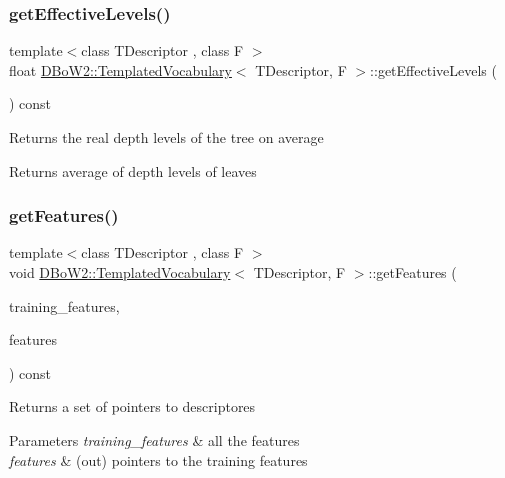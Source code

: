 \subsubsection{\texorpdfstring{get\+Effective\+Levels()}{getEffectiveLevels()}}
{\footnotesize\ttfamily template$<$class T\+Descriptor , class F $>$ \\
float \mbox{\hyperlink{class_d_bo_w2_1_1_templated_vocabulary}{D\+Bo\+W2\+::\+Templated\+Vocabulary}}$<$ T\+Descriptor, F $>$\+::get\+Effective\+Levels (\begin{DoxyParamCaption}{ }\end{DoxyParamCaption}) const}

Returns the real depth levels of the tree on average \begin{DoxyReturn}{Returns}
average of depth levels of leaves 
\end{DoxyReturn}
\mbox{\label{class_d_bo_w2_1_1_templated_vocabulary_ace8155a70fa5163d117dc6a2ef923205}} 
\subsubsection{\texorpdfstring{get\+Features()}{getFeatures()}}
{\footnotesize\ttfamily template$<$class T\+Descriptor , class F $>$ \\
void \mbox{\hyperlink{class_d_bo_w2_1_1_templated_vocabulary}{D\+Bo\+W2\+::\+Templated\+Vocabulary}}$<$ T\+Descriptor, F $>$\+::get\+Features (\begin{DoxyParamCaption}\item[{const vector$<$ vector$<$ T\+Descriptor $>$ $>$ \&}]{training\+\_\+features,  }\item[{vector$<$ \mbox{\hyperlink{class_d_bo_w2_1_1_templated_vocabulary_a40913d67e369e6993c2eab80a968f829}{p\+Descriptor}} $>$ \&}]{features }\end{DoxyParamCaption}) const\hspace{0.3cm}{\ttfamily [protected]}}

Returns a set of pointers to descriptores 
\begin{DoxyParams}{Parameters}
{\em training\+\_\+features} & all the features \\
\hline
{\em features} & (out) pointers to the training features \\
\hline
\end{DoxyParams}
\mbox{\label{class_d_bo_w2_1_1_templated_vocabulary_a03912634600711fbf70355ed32b07f2c}} 
